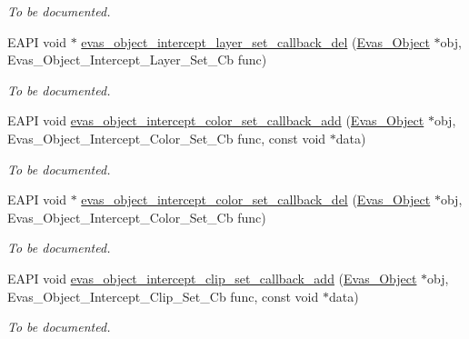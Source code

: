 \begin{DoxyCompactItemize}
\begin{DoxyCompactList}\small\item\em To be documented. \item\end{DoxyCompactList}\item 
EAPI void $\ast$ \hyperlink{group__Evas__Object__Group__Interceptors_gaae557df24e79e6f5e297c58039769756}{evas\_\-object\_\-intercept\_\-layer\_\-set\_\-callback\_\-del} (\hyperlink{group__Evas__Object__Group_ga9e19e6dd1f517a0ba437c0114d3e7c97}{Evas\_\-Object} $\ast$obj, Evas\_\-Object\_\-Intercept\_\-Layer\_\-Set\_\-Cb func)
\begin{DoxyCompactList}\small\item\em To be documented. \item\end{DoxyCompactList}\item 
EAPI void \hyperlink{group__Evas__Object__Group__Interceptors_gaa06bec22508d8a6e3d46a15ad9b9424b}{evas\_\-object\_\-intercept\_\-color\_\-set\_\-callback\_\-add} (\hyperlink{group__Evas__Object__Group_ga9e19e6dd1f517a0ba437c0114d3e7c97}{Evas\_\-Object} $\ast$obj, Evas\_\-Object\_\-Intercept\_\-Color\_\-Set\_\-Cb func, const void $\ast$data)
\begin{DoxyCompactList}\small\item\em To be documented. \item\end{DoxyCompactList}\item 
EAPI void $\ast$ \hyperlink{group__Evas__Object__Group__Interceptors_gaea953f10b9d493808ed05f76070d9271}{evas\_\-object\_\-intercept\_\-color\_\-set\_\-callback\_\-del} (\hyperlink{group__Evas__Object__Group_ga9e19e6dd1f517a0ba437c0114d3e7c97}{Evas\_\-Object} $\ast$obj, Evas\_\-Object\_\-Intercept\_\-Color\_\-Set\_\-Cb func)
\begin{DoxyCompactList}\small\item\em To be documented. \item\end{DoxyCompactList}\item 
EAPI void \hyperlink{group__Evas__Object__Group__Interceptors_gac4f3f584515d02f663d32fb010bd4959}{evas\_\-object\_\-intercept\_\-clip\_\-set\_\-callback\_\-add} (\hyperlink{group__Evas__Object__Group_ga9e19e6dd1f517a0ba437c0114d3e7c97}{Evas\_\-Object} $\ast$obj, Evas\_\-Object\_\-Intercept\_\-Clip\_\-Set\_\-Cb func, const void $\ast$data)
\begin{DoxyCompactList}\small\item\em To be documented. \item\end{DoxyCompactList}\item 

\end{DoxyCompactItemize}
